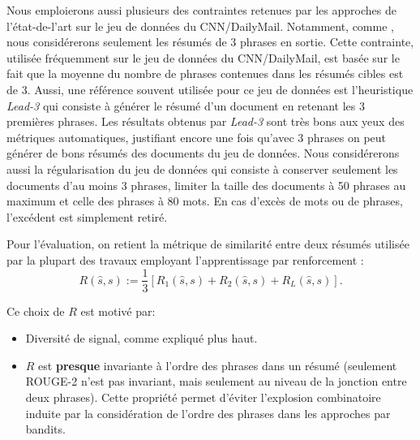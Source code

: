 Nous emploierons aussi plusieurs des contraintes retenues par les approches
de l'état-de-l'art sur le jeu de données du CNN/DailyMail.
Notamment, comme \citep{dong2018banditsum}, nous considérerons seulement les résumés
de 3 phrases en sortie.
Cette contrainte, utilisée fréquemment sur le jeu de données du CNN/DailyMail,
est basée sur le fait que la moyenne du nombre de phrases contenues dans les résumés cibles
est de 3.
Aussi, une référence souvent utilisée pour ce jeu de données est l'heuristique \textit{Lead-3} \citep{10.5555/3298483.3298681}
qui consiste à générer le résumé d'un document en retenant les 3 premières phrases.
Les résultats obtenus par \textit{Lead-3} sont très bons aux yeux des métriques automatiques,
justifiant encore une fois qu'avec 3 phrases on peut générer de bons résumés des documents du jeu
de données.
Nous considérerons aussi la régularisation du jeu de données qui consiste à conserver seulement
les documents d'au moins 3 phrases, limiter la taille des documents à 50 phrases au maximum et
celle des phrases à 80 mots.
En cas d'excès de mots ou de phrases, l'excédent est simplement retiré.

Pour l'évaluation, on retient la métrique de similarité entre deux résumés
utilisée par la plupart des travaux employant l'apprentissage par renforcement \citep{dong2018banditsum,luo-etal-2019-reading}:
\begin{equation}
    \label{eq:ROUGE}
    R(\hat{s}, s) := \frac{1}{3} \left[ R_1(\hat{s}, s) + R_2(\hat{s}, s) + R_L(\hat{s}, s) \right].
\end{equation}

Ce choix de $R$ est motivé par:

\begin{itemize}
    \item Diversité de signal, comme expliqué plus haut.
    \item $R$ est \textbf{presque} invariante à l'ordre des phrases dans un résumé (seulement ROUGE-2
          n'est pas invariant, mais seulement au niveau de la jonction entre deux phrases). Cette propriété
          permet d'éviter l'explosion combinatoire induite par la considération de l'ordre des phrases dans les
          approches par bandits.
\end{itemize}
